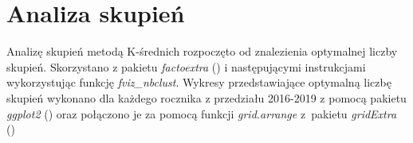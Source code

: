 \documentclass{amuthesis}
\begin{document}
\begin{table}

\caption{\label{tab:tabela2}Ramka danych dla wskaźnika syntetycznego poziomu rozwoju społeczno-gospodarczego i jego aspektów na przykładowych obserwacjach}
\centering
{}
\end{table}

\hypertarget{as_ad}{%
\section{Analiza skupień}\label{as_ad}}

Analizę skupień metodą K-średnich rozpoczęto od znalezienia optymalnej liczby skupień. Skorzystano z pakietu \emph{factoextra} (\textcite{R-factoextra}) i następującymi instrukcjami wykorzystując funkcję \emph{fviz\_nbclust}. Wykresy przedstawiające optymalną liczbę skupień wykonano dla każdego rocznika z przedziału 2016-2019 z pomocą pakietu \emph{ggplot2} (\textcite{R-ggplot2}) oraz połączono je za pomocą funkcji \emph{grid.arrange} z~pakietu \emph{gridExtra} (\textcite{R-gridExtra})
\end{document}
